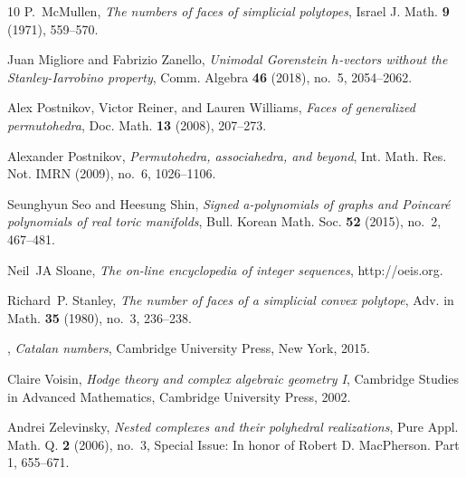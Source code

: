 \documentclass[10pt]{amsart}
\theoremstyle{plain}
\numberwithin{equation}{section}
\theoremstyle{definition}
\begin{document}
\begin{thebibliography}{10}
P.~McMullen, \emph{The numbers of faces of simplicial polytopes}, Israel J.
  Math. \textbf{9} (1971), 559--570. 

Juan Migliore and Fabrizio Zanello, \emph{Unimodal {G}orenstein {$h$}-vectors
  without the {S}tanley-{I}arrobino property}, Comm. Algebra \textbf{46}
  (2018), no.~5, 2054--2062. 

Alex Postnikov, Victor Reiner, and Lauren Williams, \emph{Faces of generalized
  permutohedra}, Doc. Math. \textbf{13} (2008), 207--273. 

Alexander Postnikov, \emph{Permutohedra, associahedra, and beyond}, Int. Math.
  Res. Not. IMRN (2009), no.~6, 1026--1106. 

Seunghyun Seo and Heesung Shin, \emph{Signed a-polynomials of graphs and
  {P}oincar\'e{} polynomials of real toric manifolds}, Bull. Korean Math. Soc.
  \textbf{52} (2015), no.~2, 467--481. 

Neil~JA Sloane, \emph{The on-line encyclopedia of integer sequences},
  http://oeis.org.

Richard~P. Stanley, \emph{The number of faces of a simplicial convex polytope},
  Adv. in Math. \textbf{35} (1980), no.~3, 236--238. 

\bysame, \emph{Catalan numbers}, Cambridge University Press, New York, 2015.

Claire Voisin, \emph{Hodge theory and complex algebraic geometry {I}},
  Cambridge Studies in Advanced Mathematics, Cambridge University Press, 2002.

Andrei Zelevinsky, \emph{Nested complexes and their polyhedral realizations},
  Pure Appl. Math. Q. \textbf{2} (2006), no.~3, Special Issue: In honor of
  Robert D. MacPherson. Part 1, 655--671. 

\end{thebibliography}
\end{document}
